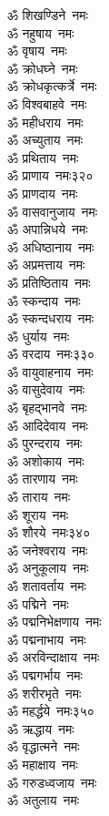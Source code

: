 \begin{multicols}{2}
\begin{flushleft}
ॐ शिखण्डिने~नमः\\
ॐ नहुषाय~नमः\\
ॐ वृषाय~नमः\\
ॐ क्रोधघ्ने~नमः\\
ॐ क्रोधकृत्कर्त्रे~नमः\\
ॐ विश्वबाहवे~नमः\\
ॐ महीधराय~नमः\\
ॐ अच्युताय~नमः\\
ॐ प्रथिताय~नमः\\
ॐ प्राणाय~नमः\hfill ३२०\\
ॐ प्राणदाय~नमः\\
ॐ वासवानुजाय~नमः\\
ॐ अपान्निधये~नमः\\
ॐ अधिष्ठानाय~नमः\\
ॐ अप्रमत्ताय~नमः\\
ॐ प्रतिष्ठिताय~नमः\\
ॐ स्कन्दाय~नमः\\
ॐ स्कन्दधराय~नमः\\
ॐ धुर्याय~नमः\\
ॐ वरदाय~नमः\hfill ३३०\\
ॐ वायुवाहनाय~नमः\\
ॐ वासुदेवाय~नमः\\
ॐ बृहद्भानवे~नमः\\
ॐ आदिदेवाय~नमः\\
ॐ पुरन्दराय~नमः\\
ॐ अशोकाय~नमः\\
ॐ तारणाय~नमः\\
ॐ ताराय~नमः\\
ॐ शूराय~नमः\\
ॐ शौरये~नमः\hfill ३४०\\
ॐ जनेश्वराय~नमः\\
ॐ अनुकूलाय~नमः\\
ॐ शतावर्ताय~नमः\\
ॐ पद्मिने~नमः\\
ॐ पद्मनिभेक्षणाय~नमः\\
ॐ पद्मनाभाय~नमः\\
ॐ अरविन्दाक्षाय~नमः\\
ॐ पद्मगर्भाय~नमः\\
ॐ शरीरभृते~नमः\\
ॐ महर्द्धये~नमः\hfill ३५०\\
ॐ ऋद्धाय~नमः\\
ॐ वृद्धात्मने~नमः\\
ॐ महाक्षाय~नमः\\
ॐ गरुडध्वजाय~नमः\\
ॐ अतुलाय~नमः\\

\end{flushleft}
\end{multicols}
